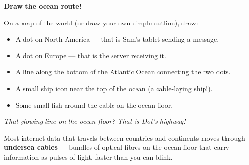 \sectionrule

\begin{tryit}
  \textbf{Draw the ocean route!}

  On a map of the world (or draw your own simple outline), draw:
  \begin{itemize}
    \item A dot on North America — that is Sam's tablet sending a message.
    \item A dot on Europe — that is the server receiving it.
    \item A line along the bottom of the Atlantic Ocean connecting the two dots.
    \item A small ship icon near the top of the ocean (a cable-laying ship!).
    \item Some small fish around the cable on the ocean floor.
  \end{itemize}
  \emph{That glowing line on the ocean floor?  That is Dot's highway!}
\end{tryit}

\sectionrule

\begin{bigidea}
  Most internet data that travels between countries and continents
  moves through \textbf{undersea cables} — bundles of optical fibres on the ocean floor
  that carry information as pulses of light, faster than you can blink.
\end{bigidea}

